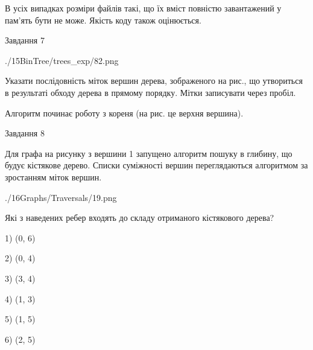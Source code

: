 \documentclass[12pt, ukrainian]{article}
\begin{document}
{В усіх випадках розміри файлів такі, що їх вміст повністю завантажений у пам'ять бути не може. Якість коду також оцінюється.



\vspace{10mm}\par

\newpage
\begin{minipage}[t]{9.7cm}
               
{\begin{center}Завдання {7}\end{center}}
\vspace{-6mm}

\begin{center}
	{./15BinTree/trees_exp/82.png}
\end{center}
Указати послідовність міток вершин дерева, зображеного на рис., що утвориться в результаті обходу дерева в прямому порядку. Мітки записувати через пробіл.\par Алгоритм починає роботу з кореня (на рис. це верхня вершина).\par

\end{minipage}
\vline \hspace{8mm}
\begin{minipage}[t]{8.0cm}
               
{\begin{center}Завдання {8}\end{center}}
\vspace{-6mm}
Для графа на рисунку з вершини 1 запущено алгоритм пошуку в глибину, що будує кістякове дерево. Списки суміжності вершин переглядаються алгоритмом за зростанням міток вершин.\par
\begin{center}
	{./16Graphs/Traversals/19.png}
\end{center}
\par Які з наведених ребер входять до складу отриманого кістякового дерева?\par
1) (0, 6)\par
2) (0, 4)\par
3) (3, 4)\par
4) (1, 3)\par
5) (1, 5)\par
6) (2, 5)\par
{\vskip 15pt} \par


\end{minipage}}
\end{document}
